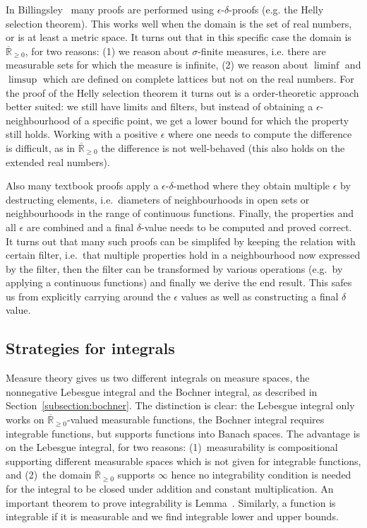 \documentclass{svjour3}
\newcommand{\ennRR}{\overline{\mathbb{R}}_{\ge 0}}
\begin{document}
In Billingsley~\cite{billingsley:95} many proofs are performed using $\epsilon$-$\delta$-proofs (e.g. the Helly selection theorem). This works well when the domain is the set of real numbers, or is at least a metric space. It turns out that in this specific case the domain is $\ennRR$, for two reasons: (1) we reason about $\sigma$-finite measures, i.e. there are measurable sets for which the measure is infinite, (2) we reason about $\liminf$ and $\limsup$ which are defined on complete lattices but not on the real numbers. For the proof of the Helly selection theorem it turns out is a order-theoretic approach better suited: we still have limits and filters, but instead of obtaining a $\epsilon$-neighbourhood of a specific point, we get a lower bound for which the property still holds. Working with a positive $\epsilon$ where one needs to compute the difference is difficult, as  in $\ennRR$ the difference is not well-behaved (this also holds on the extended real numbers). 

Also many textbook proofs apply a $\epsilon$-$\delta$-method where they obtain multiple $\epsilon$ by destructing elements, i.e.~diameters of neighbourhoods in open sets or neighbourhoods in the range of continuous functions.  Finally, the properties and all $\epsilon$ are combined and a final $\delta$-value needs to be computed and proved correct. It turns out that many such proofs can be simplifed by keeping the relation with certain filter, i.e.~that multiple properties hold in a neighbourhood now expressed by the filter, then the filter can be transformed by various operations (e.g.~by applying a continuous functions) and finally we derive the end result. This safes us from explicitly carrying around the $\epsilon$ values as well as constructing a final $\delta$ value.


\subsection{Strategies for integrals}

Measure theory gives us two different integrals on measure spaces, the nonnegative Lebesgue integral and the Bochner integral, as described in Section~\ref{subsection:bochner}. The distinction is clear: the Lebesgue integral only works on $\ennRR$-valued measurable functions, the Bochner integral requires integrable functions, but supports functions into Banach spaces. The advantage is on the Lebesgue integral, for two reasons: (1)~measurability is compositional supporting different measurable spaces which is not given for integrable functions, and (2)~the domain $\ennRR$ supports $\infty$ hence no integrability condition is needed for the integral to be closed under addition and constant multiplication. An important theorem to prove integrability is Lemma~. Similarly, a function is integrable if it is measurable and we find integrable lower and upper bounds.
\end{document}
